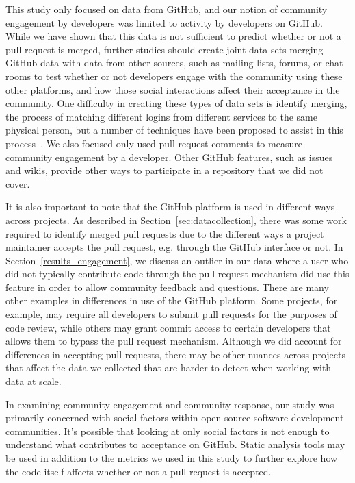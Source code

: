 \documentclass{iitthesis}
\begin{document}

This study only focused on data from GitHub, and our notion of community
engagement by developers was limited to activity by developers on GitHub. While
we have shown that this data is not sufficient to predict whether or not a pull
request is merged, further studies should create joint data sets merging GitHub
data with data from other sources, such as mailing lists, forums, or chat rooms
to test whether or not developers engage with the community using these other
platforms, and how those social interactions affect their acceptance in the
community. One difficulty in creating these types of data sets is identify
merging, the process of matching different logins from different services to the
same physical person, but a number of techniques have been proposed to assist in
this process~\cite{bird_open_2007, goeminne_comparison_2013, kouters_whos_2012}.
We also focused only used pull request comments to measure community engagement
by a developer. Other GitHub features, such as issues and wikis, provide other
ways to participate in a repository that we did not cover.

It is also important to note that the GitHub platform is used in different ways
across projects. As described in Section~\ref{sec:datacollection}, there was
some work required to identify merged pull requests due to the different ways a
project maintainer accepts the pull request, e.g. through the GitHub interface
or not. In Section~\ref{results_engagement}, we discuss an outlier in our data
where a user who did not typically contribute code through the pull request
mechanism did use this feature in order to allow community feedback and
questions. There are many other examples in differences in use of the GitHub
platform. Some projects, for example, may require all developers to submit pull
requests for the purposes of code review, while others may grant commit access
to certain developers that allows them to bypass the pull request mechanism.
Although we did account for differences in accepting pull requests, there may be
other nuances across projects that affect the data we collected that are harder
to detect when working with data at scale.

 \label{sec:future_work}

In examining community engagement and community response, our study was
primarily concerned with social factors within open source software development
communities. It's possible that looking at only social factors is not enough to
understand what contributes to acceptance on GitHub. Static analysis tools may
be used in addition to the metrics we used in this study to further explore how
the code itself affects whether or not a pull request is accepted.
\end{document}
